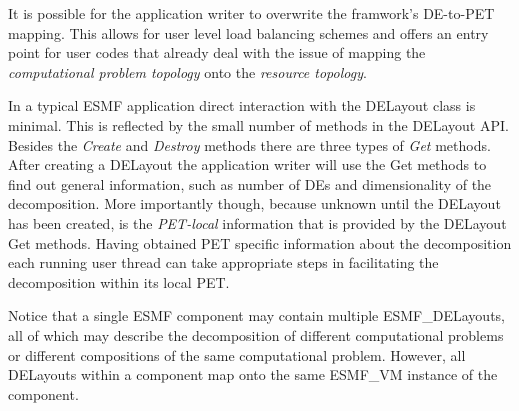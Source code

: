 It is possible for the application writer to overwrite the framwork's DE-to-PET mapping. This allows for user level load balancing schemes and offers an entry point for user codes that already deal with the issue of mapping the {\em computational problem topology} onto the {\em resource topology}.

In a typical ESMF application direct interaction with the DELayout class is minimal. This is reflected by the small number of methods in the DELayout API. Besides the {\it Create} and {\it Destroy} methods there are three types of {\it Get} methods. After creating a DELayout the application writer will use the Get methods to find out general information, such as number of DEs and dimensionality of the decomposition. More importantly though, because unknown until the DELayout has been created, is the {\it PET-local} information that is provided by the DELayout Get methods. Having obtained PET specific information about the decomposition each running user thread can take appropriate steps in facilitating the decomposition within its local PET.

Notice that a single ESMF component may contain multiple ESMF\_DELayouts, all of which may describe the decomposition of different computational problems or different compositions of the same computational problem. However, all DELayouts within a component map onto the same ESMF\_VM instance of the component.

